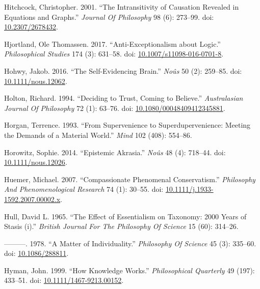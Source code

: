 \documentclass[
  10pt,
  letterpaper,
  DIV=11,
  numbers=noendperiod,
  twoside]{scrartcl}
\newlength{\cslhangindent}
\newenvironment{CSLReferences}[2] %
 {\begin{list}{}{%
  \setlength{\itemindent}{0pt}
  \setlength{\leftmargin}{0pt}
  \setlength{\parsep}{0pt}
  \ifodd #1
   \setlength{\leftmargin}{\cslhangindent}
   \setlength{\itemindent}{-1\cslhangindent}
  \fi
  \setlength{\itemsep}{#2\baselineskip}}}
 {\end{list}}
\begin{document}
\begin{CSLReferences}{1}{0}
Hitchcock, Christopher. 2001. {``The Intransitivity of Causation
Revealed in Equations and Graphs.''} \emph{Journal Of Philosophy} 98
(6): 273--99. doi:
\href{https://doi.org/10.2307/2678432}{10.2307/2678432}.

Hjortland, Ole Thomassen. 2017. {``Anti-Exceptionalism about Logic.''}
\emph{Philosophical Studies} 174 (3): 631--58. doi:
\href{https://doi.org/10.1007/s11098-016-0701-8}{10.1007/s11098-016-0701-8}.

Hohwy, Jakob. 2016. {``The Self-Evidencing Brain.''} \emph{Noûs} 50 (2):
259--85. doi:
\href{https://doi.org/10.1111/nous.12062}{10.1111/nous.12062}.

Holton, Richard. 1994. {``Deciding to Trust, Coming to Believe.''}
\emph{Australasian Journal Of Philosophy} 72 (1): 63--76. doi:
\href{https://doi.org/10.1080/00048409412345881}{10.1080/00048409412345881}.

Horgan, Terrence. 1993. {``From Supervenience to Superdupervenience:
Meeting the Demands of a Material World.''} \emph{Mind} 102 (408):
554--86.

Horowitz, Sophie. 2014. {``Epistemic Akrasia.''} \emph{Noûs} 48 (4):
718--44. doi:
\href{https://doi.org/10.1111/nous.12026}{10.1111/nous.12026}.

Huemer, Michael. 2007. {``Compassionate Phenomenal Conservatism.''}
\emph{Philosophy And Phenomenological Research} 74 (1): 30--55. doi:
\href{https://doi.org/10.1111/j.1933-1592.2007.00002.x}{10.1111/j.1933-1592.2007.00002.x}.

Hull, David L. 1965. {``The Effect of Essentialism on Taxonomy: 2000
Years of Stasis (i).''} \emph{British Journal For The Philosophy Of
Science} 15 (60): 314--26.

---------. 1978. {``A Matter of Individuality.''} \emph{Philosophy Of
Science} 45 (3): 335--60. doi:
\href{https://doi.org/10.1086/288811}{10.1086/288811}.

Hyman, John. 1999. {``How Knowledge Works.''} \emph{Philosophical
Quarterly} 49 (197): 433--51. doi:
\href{https://doi.org/10.1111/1467-9213.00152}{10.1111/1467-9213.00152}.


\end{CSLReferences}
\end{document}
